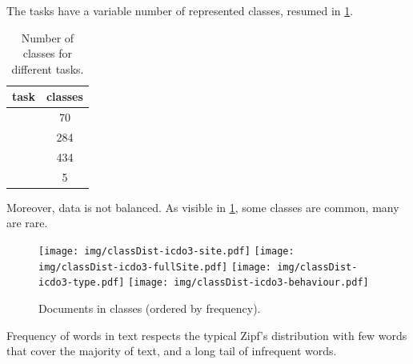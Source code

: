 
The tasks have a variable number of represented classes, resumed in
\cref{fig:numClasses}.
\begin{table}
  \center
  \caption{Number of classes for different tasks.}
  \label{fig:numClasses}
  \begin{tabular}{|l|c|}
    \hline
    task & classes \\
    \hline
    \site{} & 70 \\
    \fullSite{} & 284 \\
    \type{} & 434 \\
    \behaviour{} & 5 \\
    \hline
  \end{tabular}
\end{table}
Moreover, data is not balanced. As visible in \cref{fig:classDist},
some classes are common, many are rare.
\begin{figure}
  \centering
  \texttt{[image: img/classDist-icdo3-site.pdf]}
  \texttt{[image: img/classDist-icdo3-fullSite.pdf]}
  \texttt{[image: img/classDist-icdo3-type.pdf]}
  \texttt{[image: img/classDist-icdo3-behaviour.pdf]}
  \caption{Documents in classes (ordered by
    frequency).}
  \label{fig:classDist}
\end{figure}

Frequency of words in text
respects the typical Zipf's distribution with few words that cover the
majority of text, and a long tail of infrequent words.

